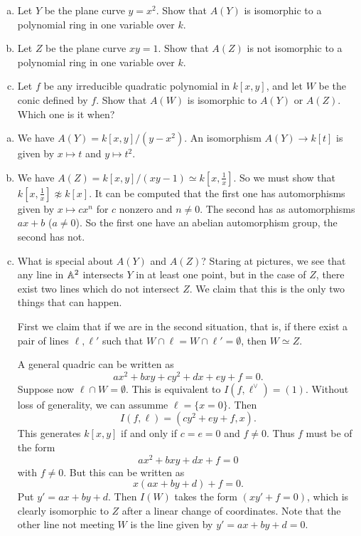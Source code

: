 \documentclass[11pt, english]{article}
\begin{document}
\begin{exc}[Exercise 1.1]
  \begin{enumerate}[a)]
  \item Let $Y$ be the plane curve $y=x^2$. Show that $A(Y)$ is isomorphic to a polynomial ring in one variable over $k$.
\item Let $Z$ be the plane curve $xy=1$. Show that $A(Z)$ is not isomorphic to a polynomial ring in one variable over $k$.
\item Let $f$ be any irreducible quadratic polynomial in $k[x,y]$, and let $W$ be the conic defined by $f$. Show that $A(W)$ is isomorphic to $A(Y)$ or $A(Z)$. Which one is it when?
  \end{enumerate}
\end{exc}
\begin{sol}
  \begin{enumerate}[a)]
  \item  We have $A(Y)=k[x,y]/(y-x^2)$. An isomorphism $A(Y) \to k[t]$ is given by $x \mapsto t$ and $y \mapsto t^2$. 
\item We have $A(Z) = k[x,y]/(xy-1) \simeq k[x,\frac 1x]$. So we must show that $k[x,\frac 1x] \not \approx k[x]$. It can be computed that the first one has automorphisms given by $x \mapsto cx^n$ for $c$ nonzero and $n \neq 0$. The second has as automorphisms $ax+b$ ($a \neq 0$). So the first one have an abelian automorphism group, the second has not.
\item What is special about $A(Y)$ and $A(Z)$? Staring at pictures, we see that any line in $\mathbb{A}^2$ intersects $Y$ in at least one point, but in the case of $Z$, there exist two lines which do not intersect $Z$. We claim that this is the only two things that can happen.

First we claim that if we are in the second situation, that is, if there exist a pair of lines $\ell,\ell'$ such that $W \cap \ell = W \cap \ell' =\emptyset$, then $W \simeq Z$. 

A general quadric can be written as
\[
ax^2+bxy+cy^2+dx+ey+f=0.
\]
Suppose now $\ell \cap W=\emptyset$. This is equivalent to $I(f,\ell^\vee)=(1)$. Without loss of generality, we can assumme $\ell = \{ x = 0 \}$. Then
\[
I(f,\ell) = (cy^2+ey+f,x).
\]
This generates $k[x,y]$ if and only if $c=e=0$ and $f \neq 0$. Thus $f$ must be of the form
\[
ax^2+bxy+dx+f=0
\]
with $f \neq 0$. But this can be written as
\[
x(ax+by+d)+f = 0.
\]
Put $y' = ax+by+d$. Then $I(W)$ takes the form $(xy'+f=0)$, which is clearly isomorphic to $Z$ after a linear change of coordinates. Note that the other line not meeting $W$ is the line given by $y'=ax+by+d=0$.


\end{enumerate}
\end{sol}
\end{document}

